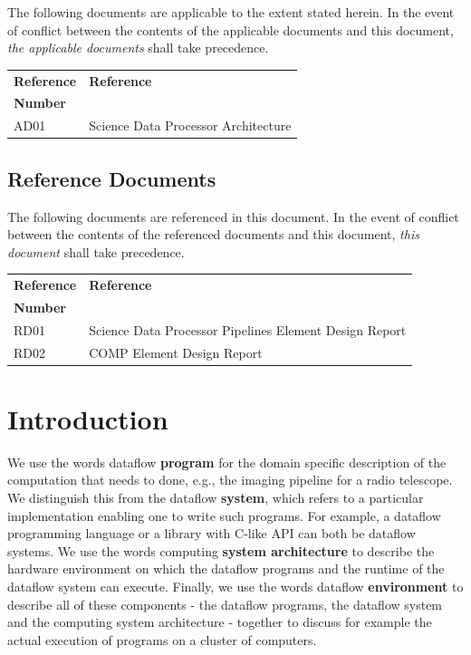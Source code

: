 \documentclass[11pt,a4paper]{article}
\begin{document}
The following documents are applicable to the extent stated herein. In the
event of conflict between the contents of the applicable documents and this
document, \emph{the applicable documents} shall take precedence.

\begin{center}{
\begin{tabularx}{\textwidth}{|X|X|}
    \hline
    \bf{Reference} & \bf{Reference}\\
    \bf{Number} & \\
    \hline
    AD01 & Science Data Processor Architecture\\\hline
\end{tabularx}}
\end{center}

\subsection*{Reference Documents}

The following documents are referenced in this document. In the event of
conflict between the contents of the referenced documents and this document,
\emph{this document} shall take precedence.

\begin{center}{
\begin{tabularx}{\textwidth}{|X|X|}
    \hline
    \bf{Reference} & \bf{Reference}\\
    \bf{Number} & \\
    \hline
    RD01 & Science Data Processor Pipelines Element Design Report\\\hline
    RD02 & COMP Element Design Report\\\hline
  \end{tabularx}}
\end{center}



\newpage
\section{Introduction}

We use the words dataflow {\bf program} for the domain specific
description of the computation that needs to done, e.g., the imaging
pipeline for a radio telescope.  We distinguish this from the dataflow
{\bf system}, which refers to a particular implementation enabling one
to write such programs. For example, a dataflow programming language
or a library with C-like API can both be dataflow systems.  We use the
words computing {\bf system architecture} to describe the hardware
environment on which the dataflow programs and the runtime of the
dataflow system can execute.  Finally, we use the words dataflow {\bf
  environment} to describe all of these components - the dataflow
programs, the dataflow system and the computing system architecture -
together to discuss for example the actual execution of programs on a
cluster of computers.
\end{document}
